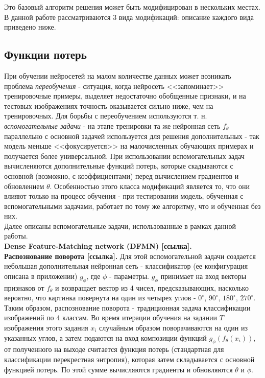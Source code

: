 \documentclass[a4paper, 12pt]{report}
\begin{document}
Это базовый алгоритм решения может быть модифицирован в нескольких местах. В данной работе рассматриваются 3 вида модификаций: описание каждого вида приведено ниже.

\subsection{Функции потерь}
При обучении нейросетей на малом количестве данных может возникать проблема \textit{переобучения} - ситуация, когда нейросеть <<запоминает>> тренировочные примеры, выделяет недостаточно обобщенные признаки, и на тестовых изображениях точность оказывается сильно ниже, чем на тренировочных. Для борьбы с переобучением используются т. н. \textit{вспомогательные задачи} - на этапе тренировки та же нейронная сеть $f_{\theta}$ параллельно с основной задачей используется для решения дополнительных - так модель меньше <<фокусируется>> на малочисленных обучающих примерах и получается более универсальной. При использовании вспомогательных задач вычисленяются дополнительные функций потерь, которые скадываются с основной (возможно, с коэффициентами) перед вычислением градиентов и обновлением $\theta$. Особенностью этого класса модификаций является то, что они влияют только на процесс обучения - при тестировании модель, обученная с вспомогательными задачами, работает по тому же алгоритму, что и обученная без них. \\

Далее описаны вспомогательные задачи, использованные в рамках данной работы. \\

\textbf {Dense Feature-Matching network (DFMN) [ссылка].} \\

\textbf {Распознование поворота [ссылка].} Для этой вспомогательной задачи создается небольшая дополнительная нейронная сеть - классификатор (ее конфигурация описана в приложении) $g_{\phi}$, где $\phi$ - параметры. $g_{\phi}$ принимает на вход векторы признаков от $f_{\theta}$ и возвращает вектор из 4 чисел, предсказывающих, насколько вероятно, что картинка повернута на один из четырех углов - $0^{\circ}$, $90^{\circ}$, $180^{\circ}$, $270^{\circ}$. Таким образом, распознование поворота - традиционная задача классификации изображений по 4 классам. Во время итерации обучения на задании $T$ изображения этого задания $x_{i}$ случайным образом поворачиваются на один из указанных углов, а затем подаются на вход композиции функций $g_{\phi}(f_{\theta}(x_i))$, от полученного на выходе считается функция потерь (стандартная для классификации перекрестная энтропия), которая затем складывается с основной функцией потерь. По этой сумме вычисляются градиенты и обновляются $\theta$ и $\phi$.
\end{document}
